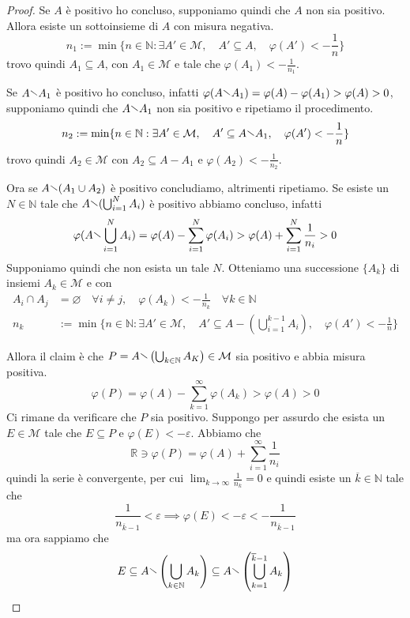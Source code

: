 \begin{proof}
    Se \(A\) è positivo ho concluso, supponiamo quindi che \(A\) non sia
    positivo. Allora esiste un sottoinsieme di \(A\) con misura negativa.
    \[
        n_{1} := \min \{n \in \mathbb{N} : \exists A' \in \mathcal{M}, \quad A'
        \subseteq A, \quad \varphi(A') < - \frac{1}{n} \} 
    \]
    trovo quindi \(A_{1} \subseteq A \), con \(A_{1} \in \mathcal{M}\) e tale
    che \(\varphi(A_{1}) < -\frac{1}{n_{1}}\).

    Se \(A\sminus A_{1}\) è positivo ho concluso, infatti \(\varphi(A \sminus
    A_{1}) = \varphi(A) - \varphi(A_{1}) > \varphi(A)>0\), supponiamo quindi che
    \(A \sminus A_{1}\) non sia positivo e ripetiamo il procedimento.
    \[
        n_{2} := \min \{n \in \mathbb{N}: \exists A' \in \mathcal{M}, \quad A'
        \subseteq A \sminus A_{1}, \quad \varphi(A') < -\frac{1}{n} \} 
    \]
    trovo quindi \(A_{2} \in \mathcal{M}\) con \(A_{2} \subseteq A - A_{1} \) e
    \(\varphi(A_{2}) < -\frac{1}{n_{2}}\).

    Ora se \(A \sminus (A_{1} \cup A_{2})\) è positivo concludiamo, altrimenti
    ripetiamo.
    Se esiste un \(N \in \mathbb{N}\) tale che \(A \sminus (\bigcup_{i=1}^{N}
    A_{i} )\) è positivo abbiamo concluso, infatti
    \[
        \varphi(A \sminus \bigcup_{i=1}^{N} A_{i}) = \varphi(A) - \sum_{i=1}^{N}
        \varphi(A_{i}) > \varphi(A) + \sum_{i=1}^{N} \frac{1}{n_{i}} > 0
    \]
    Supponiamo quindi che non esista un tale \(N\). Otteniamo una successione
    \(\{A_k\} \) di insiemi \(A_k \in \mathcal{M}\) e con
    \begin{align*}
        A_{i} \cap A_{j} &= \varnothing \quad \forall i \neq j, \quad
        \varphi(A_k) < -\frac{1}{n_{k}} \quad \forall k \in \mathbb{N} \\
        n_k &:= \min \{n \in \mathbb{N}: \exists A' \in \mathcal{M}, \quad A'
        \subseteq A - \left( \bigcup_{i=1}^{k-1} A_{i}  \right), \quad
    \varphi(A') < -\frac{1}{n} \} 
    \end{align*}
    
    Allora il claim è che \(P = A \sminus \left( \bigcup_{k \in \mathbb{N}} A_K
    \right) \in \mathcal{M}\) sia positivo e abbia misura positiva.
    \[
        \varphi(P) = \varphi(A) - \sum_{k=1}^{\infty} \varphi(A_{k}) >
        \varphi(A) > 0
    \]
    Ci rimane da verificare che \(P\) sia positivo. Suppongo per assurdo che
    esista un \(E \in \mathcal{M}\) tale che \(E \subseteq P \) e \(\varphi(E) <
    -\varepsilon\). Abbiamo che
    \[
        \mathbb{R} \ni \varphi(P) = \varphi(A) + \sum_{i=1}^{\infty}
        \frac{1}{n_{i}} 
    \]
    quindi la serie è convergente, per cui \(\lim_{k \to \infty} \frac{1}{n_k} =
    0\) e quindi esiste un \(\overline{k} \in \mathbb{N}\) tale che 
    \[
        \frac{1}{n_{\overline{k} - 1}} < \varepsilon \implies \varphi(E) <
        -\varepsilon < -\frac{1}{n_{\overline{k} - 1}}
    \]
    ma ora sappiamo che 
    \[
        E \subseteq A \sminus \left( \bigcup_{k \in \mathbb{N}} A_k \right)
        \subseteq A \sminus \left( \bigcup_{k=1}^{\overline{k}-1} A_k \right)  
    \]
\end{proof}
